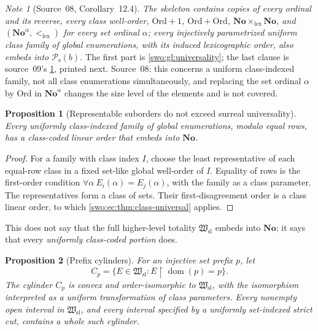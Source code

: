 \documentclass[11pt]{article}
\newtheorem{proposition}[proposition]{Proposition}
\theoremstyle{definition}
\theoremstyle{remark}
\newtheorem{note}[note]{Note}
\newcommand{\No}{\mathbf{No}}
\newcommand{\Ord}{\mathrm{Ord}}
\newcommand{\Hsl}{\mathfrak W_{\mathrm{sl}}}
\newcommand{\Psupp}{\mathcal P_{\mathrm{s}}}
\newcommand{\lex}{\mathrm{lex}}
\newcommand{\dom}{\operatorname{dom}}
\begin{document}
\begin{note}[Source~08, Corollary~12.4]\label{swo:sk:cor:examples}
\emph{The skeleton contains copies of every ordinal and its reverse, every
class well-order, $\Ord+1$, $\Ord+\Ord$, $\No\times_{\lex}\No$, and
$(\No^\alpha,<_{\lex})$ for every set ordinal $\alpha$; every injectively
parametrized uniform class family of global enumerations, with its induced
lexicographic order, also embeds into $\Psupp(b)$.} The first part is
\cref{swo:gl:universality}; the last clause is source~09's
\cref{swo:ec:prop:representable}, printed next. Source~08: this concerns a
uniform class-indexed family, not all class enumerations simultaneously, and
replacing the set ordinal $\alpha$ by $\Ord$ in $\No^\alpha$ changes the size
level of the elements and is not covered.
\end{note}

\begin{proposition}[Representable suborders do not exceed surreal universality]
\label{swo:ec:prop:representable}
Every uniformly class-indexed family of global enumerations, modulo
equal rows, has a class-coded linear order that embeds into $\No$.
\end{proposition}
\begin{proof}
For a family with class index $I$, choose the least representative of
each equal-row class in a fixed set-like global well-order of $I$.
Equality of rows is the first-order condition
$\forall\alpha\ E_i(\alpha)=E_j(\alpha)$, with the family as a class
parameter. The representatives form a class of sets. Their
first-disagreement order is a class linear order, to which
\cref{swo:ec:thm:class-universal} applies.
\end{proof}
This does not say that the full higher-level totality $\Hsl$ embeds into
$\No$; it says that every \emph{uniformly class-coded portion} does.

\begin{proposition}[Prefix cylinders]\label{swo:gl:cylinders}
For an injective set prefix $p$, let
\[
 C_p=\{E\in\Hsl:E\upharpoonright\dom(p)=p\}.
\]
The cylinder $C_p$ is convex and order-isomorphic to $\Hsl$, with the
isomorphism interpreted as a uniform transformation of class parameters.
Every nonempty open interval in $\Hsl$, and every interval specified by a
uniformly set-indexed strict cut, contains a whole such cylinder.
\end{proposition}
\end{document}
